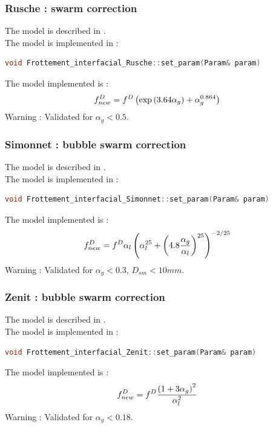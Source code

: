 \subsubsection{Rusche : swarm correction}
The model is described in \textcite{Rusche}.\\
The model is implemented in :
\begin{lstlisting}[language=c++]
void Frottement_interfacial_Rusche::set_param(Param& param)
\end{lstlisting}
The model implemented is :
\begin{equation}
   f^{D}_{new}=f^{D}\left( \exp\left( 3.64\alpha_g \right)+\alpha_g^{0.864} \right)
\end{equation}
{\color{red} Warning} : Validated for $\alpha_g  < 0.5$.

\subsubsection{Simonnet : bubble swarm correction}
The model is described in \textcite{SIMONNET2007858}.\\
The model is implemented in :
\begin{lstlisting}[language=c++]
void Frottement_interfacial_Simonnet::set_param(Param& param)
\end{lstlisting}
The model implemented is :
\begin{equation}
   f^{D}_{new}=f^{D}\alpha_l\left( \alpha_l^{25} + \left( 4.8\frac{\alpha_g}{\alpha_l} \right)^{25} \right)^{-2/25}
\end{equation}
{\color{red} Warning} : Validated for $\alpha_g  < 0.3$, $D_{sm} < 10 mm$.

\subsubsection{Zenit : bubble swarm correction}
The model is described in \textcite{zenit}.\\
The model is implemented in :
\begin{lstlisting}[language=c++]
void Frottement_interfacial_Zenit::set_param(Param& param)
\end{lstlisting}
The model implemented is :
\begin{equation}
   f^{D}_{new}=f^{D}\frac{\left( 1+3\alpha_g \right)^2}{\alpha_l^2}
\end{equation}
{\color{red} Warning} : Validated for  $\alpha_g  < 0.18$.


